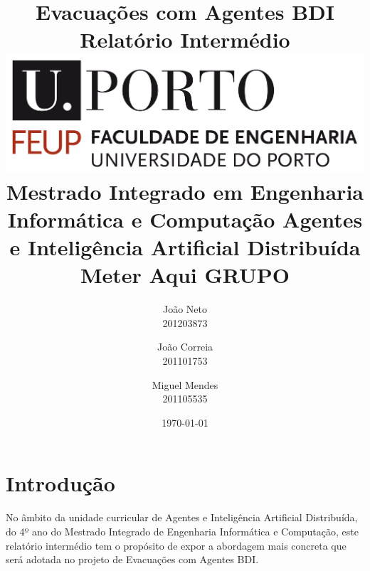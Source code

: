 \documentclass[a4paper,11pt]{article}
\begin{document}
\title{\Huge\textbf{Evacuações com Agentes BDI}\linebreak\linebreak\linebreak
\Large\textbf{Relatório Intermédio}\linebreak\linebreak
\linebreak\linebreak
\includegraphics[scale=0.1]{feup-logo.png}\linebreak\linebreak
\linebreak\linebreak
\Large{Mestrado Integrado em Engenharia Informática e Computação} \linebreak\linebreak
\Large{Agentes e Inteligência Artificial Distribuída}\linebreak\linebreak
\Large{Meter Aqui GRUPO}}
\author{
João Neto \\ 201203873 \\
\and
João Correia\\ 201101753 \\
\and
Miguel Mendes\\ 201105535 \\}
\date{\today}

\maketitle

\newpage

\tableofcontents

\newpage
\section{Introdução}
No âmbito da unidade curricular de Agentes e Inteligência Artificial Distribuída, do 4º ano do Mestrado Integrado de Engenharia Informática e Computação, este relatório intermédio tem o propósito de expor a abordagem mais concreta que será adotada no projeto de Evacuações com Agentes BDI.
\end{document}
